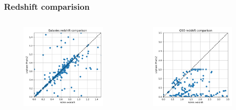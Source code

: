 \documentclass{beamer}
\begin{document}
\begin{frame}
    \frametitle{Redshift comparision}
    \begin{columns}
        \begin{figure}
            \centering
            \includegraphics[width=1.0\textwidth]{../../figs/galaxy_redshift_comparison.png}
        \end{figure}
        \pause
        \begin{figure}
            \centering
            \includegraphics[width=1.0\textwidth]{../../figs/qso_redshift_comparison.png}
        \end{figure}
    \end{columns}
\end{frame}
\end{document}
